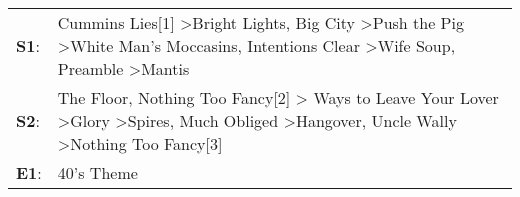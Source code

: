 \begin{supertabular}{p{0.03\textwidth}p{0.92\textwidth}}
 \textbf{S1}:  &                                       Cummins Lies[1]\textsuperscript{} \textgreater \enspace Bright Lights, Big City\textsuperscript{} \textgreater \enspace Push the Pig\textsuperscript{} \textgreater \enspace White Man's Moccasins\textsuperscript{}, \enspace Intentions Clear\textsuperscript{} \textgreater \enspace Wife Soup\textsuperscript{}, \enspace Preamble\textsuperscript{} \textgreater \enspace Mantis\textsuperscript{}  \enspace  \\
 \textbf{S2}:  &  The Floor\textsuperscript{}, \enspace Nothing Too Fancy[2]\textsuperscript{} \textgreater {} Ways to Leave Your Lover\textsuperscript{} \textgreater \enspace Glory\textsuperscript{} \textgreater \enspace Spires\textsuperscript{}, \enspace Much Obliged\textsuperscript{} \textgreater \enspace Hangover\textsuperscript{}, \enspace Uncle Wally\textsuperscript{} \textgreater \enspace Nothing Too Fancy[3]\textsuperscript{}  \enspace  \\
 \textbf{E1}:  &                                                                                                                                                                                                                                                                                                                                                                                                                  40's Theme\textsuperscript{}  \enspace  \\
\end{supertabular}
